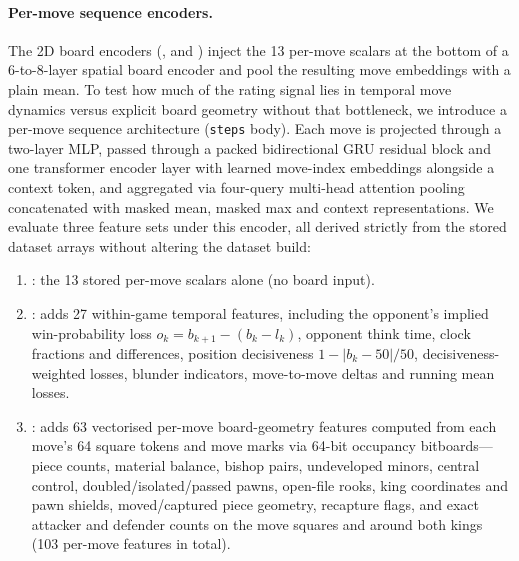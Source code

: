 \documentclass[11pt]{article}
\begin{document}
\paragraph{Per-move sequence encoders.}
The 2D board encoders (,  and
) inject the 13 per-move scalars at the bottom of a
6-to-8-layer spatial board encoder and pool the resulting move embeddings
with a plain mean. To test how much of the rating signal lies in temporal
move dynamics versus explicit board geometry without that bottleneck, we
introduce a per-move sequence architecture (\texttt{steps} body). Each move
is projected through a two-layer MLP, passed through a packed bidirectional
GRU residual block and one transformer encoder layer with learned move-index
embeddings alongside a context token, and aggregated via four-query
multi-head attention pooling concatenated with masked mean, masked max and
context representations. We evaluate three feature sets under this encoder,
all derived strictly from the stored dataset arrays without altering the
dataset build:
\begin{enumerate}
\item {}: the 13 stored per-move scalars alone (no board input).
\item {}: adds 27 within-game temporal features, including
the opponent's implied win-probability loss $o_k = b_{k+1} - (b_k - l_k)$,
opponent think time, clock fractions and differences, position decisiveness
$1 - |b_k - 50|/50$, decisiveness-weighted losses, blunder indicators,
move-to-move deltas and running mean losses.
\item {}: adds 63 vectorised per-move board-geometry features
computed from each move's 64 square tokens and move marks via 64-bit
occupancy bitboards---piece counts, material balance, bishop pairs,
undeveloped minors, central control, doubled/isolated/passed pawns, open-file
rooks, king coordinates and pawn shields, moved/captured piece geometry,
recapture flags, and exact attacker and defender counts on the move squares
and around both kings (103 per-move features in total).
\end{enumerate}
\end{document}
